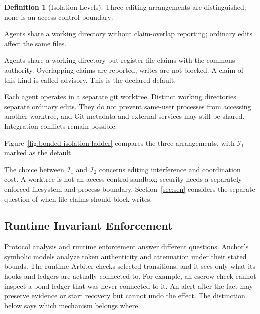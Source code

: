 \documentclass[11pt,a4paper]{article}
\theoremstyle{definition}
\newtheorem{definition}{Definition}[section]
\theoremstyle{remark}
\begin{document}
\begin{definition}[Isolation Levels]\label{def:isolation}
\pdstatus{\Designed}{}
\setlength{\parskip}{4pt plus 1pt}
Three editing arrangements are distinguished; none is an access-control boundary:
\begin{description}[nosep]
  \item[$\mathcal{I}_0$ (None):] Agents share a working directory without claim-overlap reporting; ordinary edits affect the same files.
  \item[$\mathcal{I}_1$ (Advisory):] Agents share a working directory but register file claims with the commons authority. Overlapping claims are reported; writes are not blocked. A claim of this kind is called advisory. This is the declared default.
  \item[$\mathcal{I}_2$ (Structural):] Each agent operates in a separate git worktree. Distinct working directories separate ordinary edits. They do not prevent
same-user processes from accessing another worktree, and Git metadata and
external services may still be shared. Integration conflicts remain possible.
\end{description}
\end{definition}

Figure~\ref{fig:bonded-isolation-ladder} compares the three arrangements, with $\mathcal{I}_1$ marked as the default.



The choice between $\mathcal{I}_1$ and $\mathcal{I}_2$ concerns editing interference and coordination cost.
A worktree is not an access-control sandbox; security needs a separately
enforced filesystem and process boundary. Section~\ref{sec:sen} considers
the separate question of when file claims should block writes.

\subsection{Runtime Invariant Enforcement}
Protocol analysis and runtime enforcement answer different questions.
Anchor's symbolic models analyze token authenticity and attenuation under
their stated bounds. The runtime Arbiter checks selected transitions, and it sees only what its
hooks and ledgers are actually connected to. For example, an escrow check
cannot inspect a bond ledger that was never connected to it. An alert after
the fact may preserve evidence or start recovery but cannot undo the effect.
The distinction below says which mechanism belongs where.
\end{document}
